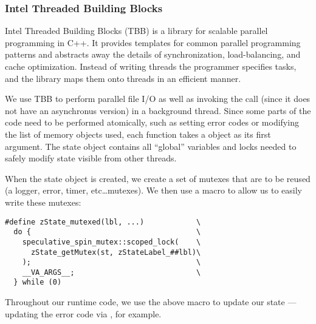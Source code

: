 
\subsubsection{Intel Threaded Building Blocks}
Intel Threaded Building Blocks\cite{reinders2007intel} (TBB) is a library for
scalable parallel
programming in C++. It provides templates for common parallel programming
patterns and abstracts away the details of synchronization, load-balancing,
and cache optimization. Instead of writing threads the programmer specifies
tasks, and the library maps them onto threads in an efficient manner.

We use TBB to perform parallel file I/O as well as invoking the
	 call (since it does not have an asynchronus version)
	in a background thread.
Since some parts of the code need to be performed atomically, such as
	setting error codes or modifying the list of memory objects used,
	each function takes a  object as its first argument.
The state object contains all ``global'' variables and locks needed to
	safely modify state visible from other threads.


When the state object is created, we create a set of mutexes that
	are to be reused (a logger, error, timer, etc\ldots mutexes).
We then use a macro to allow us to easily write these mutexes:

\begin{verbatim}
#define zState_mutexed(lbl, ...)            \
  do {                                      \
    speculative_spin_mutex::scoped_lock(    \
      zState_getMutex(st, zStateLabel_##lbl)\
    );                                      \
    __VA_ARGS__;                            \
  } while (0)
\end{verbatim}


Throughout our runtime code, we use the above macro to update our state ---
 	updating the error code via ,
	for example.


